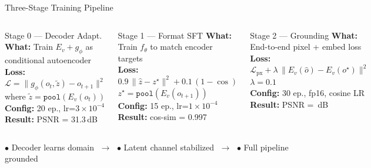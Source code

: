 \documentclass[aspectratio=169,10pt]{beamer}
\begin{document}
\begin{frame}{Three-Stage Training Pipeline}

\begin{columns}[T]
\begin{block}{\textcolor{blue!70!black}{Stage 0 — Decoder Adapt.}}
\textbf{What:} Train $E_v + g_\phi$ as conditional autoencoder\\[4pt]
\textbf{Loss:}
$\mathcal{L} = \|g_\phi(o_t,\tilde{z}) - o_{t+1}\|^2$\\[4pt]
where $\tilde{z} = \texttt{pool}(E_v(o_t))$\\[4pt]
\textbf{Config:} 20 ep., lr=$3\!\times\!10^{-4}$\\[4pt]
\textbf{Result:} PSNR = 31.3\,dB
\end{block}

\begin{block}{\textcolor{orange!80!black}{Stage 1 — Format SFT}}
\textbf{What:} Train $f_\theta$ to match encoder targets\\[4pt]
\textbf{Loss:}
$0.9\,\|\hat{z}-z^\star\|^2 + 0.1\,(1-\cos)$\\[4pt]
$z^\star = \texttt{pool}(E_v(o_{t+1}))$\\[4pt]
\textbf{Config:} 15 ep., lr=$1\!\times\!10^{-4}$\\[4pt]
\textbf{Result:} cos-sim = 0.997
\end{block}

\begin{block}{\textcolor{accentgreen}{Stage 2 — Grounding}}
\textbf{What:} End-to-end pixel + embed loss\\[4pt]
\textbf{Loss:}
$\mathcal{L}_\text{px} + \lambda\,\|E_v(\hat{o})-E_v(o^\star)\|^2$\\[4pt]
$\lambda=0.1$\\[4pt]
\textbf{Config:} 30 ep., fp16, cosine LR\\[4pt]
\textbf{Result:} PSNR = \MAINPSNR\,dB
\end{block}
\end{columns}

\vspace{8pt}
\centering
{\small
\textcolor{blue!70!black}{$\bullet$ Decoder learns domain} $\;\to\;$
\textcolor{orange!80!black}{$\bullet$ Latent channel stabilized} $\;\to\;$
\textcolor{accentgreen}{$\bullet$ Full pipeline grounded}
}

\end{frame}
\end{document}
